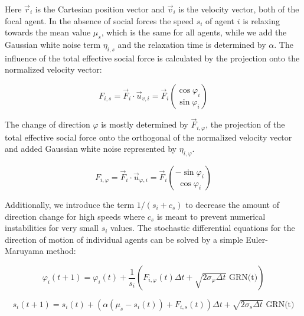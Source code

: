 \documentclass[a4paper,10pt,hidelinks]{scrreprt}
\begin{document}
	Here $\vec{r}_i$ is the Cartesian position vector and $\vec{v}_i$ is the velocity vector, both of the focal agent.
	In the absence of social forces the speed $s_i$ of agent $i$ is relaxing towards the mean value $\mu_{s}$, which is the same for all agents, while we add the Gaussian white noise term $\eta_{i, s}$ and the relaxation time is determined by $\alpha$.
	The influence of the total effective social force is calculated by the projection onto the normalized velocity vector:
	
	\begin{equation}
		F_{i, s}=\vec{F}_i \cdot \vec{u}_{v, i} = \vec{F}_i { \cos\varphi_i \choose \sin\varphi_i }
		\label{eq:s_force}
	\end{equation}
	
	The change of direction $\varphi$ is mostly determined by $\vec{F}_{i,\varphi}$, the projection of the total effective social force onto the orthogonal of the normalized velocity vector and added Gaussian white noise represented by $\eta_{i,\varphi}$.
	
	\begin{equation}
		F_{i,\varphi}=\vec{F}_i \cdot \vec{u}_{\varphi,i} = \vec{F}_i {-\sin\varphi_i \choose \cos\varphi_i }
		\label{eq:phi_force}
	\end{equation}
	
	Additionally, we introduce the term $1/(s_i + c_s)$ to decrease the amount of direction change for high speeds where $c_s$ is meant to prevent numerical instabilities for very small $s_i$ values.
	The stochastic differential equations for the direction of motion of individual agents can be solved by a simple Euler-Maruyama method:
	
	\begin{equation}
		\varphi_i(t+1) = \varphi_i(t) + \frac{1}{s_i}\left( F_{i,\varphi}(t)\Delta t + \sqrt{2 \sigma_{\varphi}\Delta t} \text{ GRN(t)}\right)
		\label{eq:phi_update}
	\end{equation}
	
	\begin{equation}
		s_i(t+1) = s_i(t) + (\alpha (\mu_s - s_i(t)) + F_{i, s}(t))\Delta t + \sqrt{2 \sigma_{s} \Delta t} \text{ GRN(t)}
		\label{eq:s_update}
	\end{equation}
	
\end{document}
